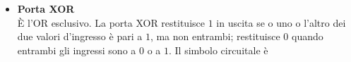 \documentclass[a4paper]{extarticle}
\begin{document}
\begin{itemize}
    \vspace{1em}
    \noindent
    \begin{tabularx}{\textwidth}{PPP}
    {
        \begin{tabular}{c|c}
             \(x\) & \(y\)\\
             \hline
             $0$ & $0$\\
             $0$ & $1$\\
             $1$ & $0$\\
             $1$ & $1$
        \end{tabular}
    }
    &
    {
    }
    &
    {
        \begin{tabular}{c}
             \(x + y\)\\
             \hline
             $0$\\
             $1$\\
             $1$\\
             $1$
        \end{tabular}
    }\\
    \end{tabularx}
    \vspace{1em}
    \noindent

    \item \textbf{Porta XOR}\\
    È l’OR esclusivo. La porta XOR restituisce \(1\) in uscita se o uno o l’altro dei due valori d’ingresso è pari a \(1\), ma non entrambi; restituisce \(0\) quando entrambi gli ingressi sono a \(0\) o a \(1\). Il simbolo circuitale è


\end{itemize}
\end{document}

